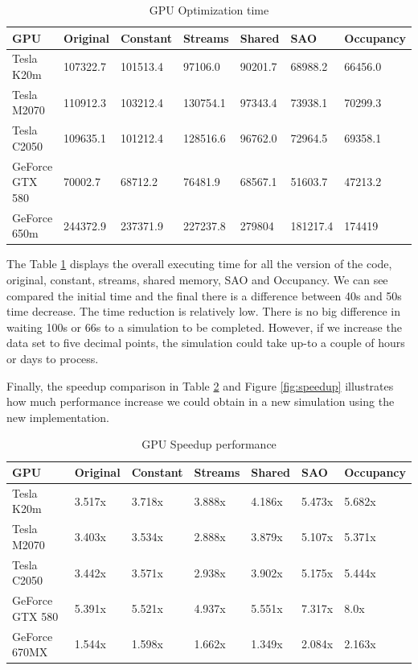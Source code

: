 \begin{table}[h]
\centering
  \begin{tabular} { |  l  |  l | l  |  l  | l | l | l |}
    \hline
    GPU & Original & Constant & Streams & Shared & SAO & Occupancy \\
    \hline
    Tesla K20m & 107322.7 & 101513.4 & 97106.0 & 90201.7 & 68988.2 & 66456.0\\
   \hline
    Tesla M2070 & 110912.3 & 103212.4 & 130754.1 & 97343.4 & 73938.1 & 70299.3\\
    \hline
    Tesla C2050 & 109635.1 & 101212.4 & 128516.6 & 96762.0 & 72964.5 & 69358.1\\
   \hline
    GeForce GTX 580 & 70002.7 & 68712.2 & 76481.9 & 68567.1 & 51603.7 & 47213.2\\
   \hline
    GeForce 650m & 244372.9 & 237371.9 & 227237.8 & 279804 & 181217.4 & 174419\\
   \hline
  \end{tabular}
    \caption{GPU Optimization time}
  \label{tab:time}
  \end{table}
  
  The Table \ref{tab:time} displays the overall executing time for all the version of the code, original, constant, streams, shared memory, SAO and Occupancy. We can see compared the initial time and the final there is a difference between 40s and 50s time decrease. The time reduction is relatively low. There is no big difference in waiting 100s or 66s to a simulation to be completed. However, if we increase the data set to five decimal points, the simulation could take up-to a couple of hours or days to process. 
  
  Finally, the speedup comparison in Table \ref{tab:speed} and Figure \ref{fig:speedup} illustrates how much performance increase we could obtain in a new simulation using the new implementation.
  
  \begin{table}[h]
\centering
  \begin{tabular} { |  l  |  l | l  |  l  | l | l | l |}
    \hline
    GPU & Original & Constant & Streams & Shared & SAO & Occupancy\\
    \hline
    Tesla K20m & 3.517x & 3.718x & 3.888x & 4.186x & 5.473x & 5.682x\\
   \hline
    Tesla M2070 & 3.403x & 3.534x & 2.888x & 3.879x & 5.107x & 5.371x\\
    \hline
    Tesla C2050 & 3.442x & 3.571x & 2.938x & 3.902x & 5.175x & 5.444x\\
   \hline
    GeForce GTX 580 & 5.391x & 5.521x & 4.937x & 5.551x & 7.317x & 8.0x\\
   \hline
    GeForce 670MX & 1.544x & 1.598x & 1.662x & 1.349x & 2.084x & 2.163x\\
   \hline
  \end{tabular}
    \caption{GPU Speedup performance}
  \label{tab:speed}
  \end{table}

